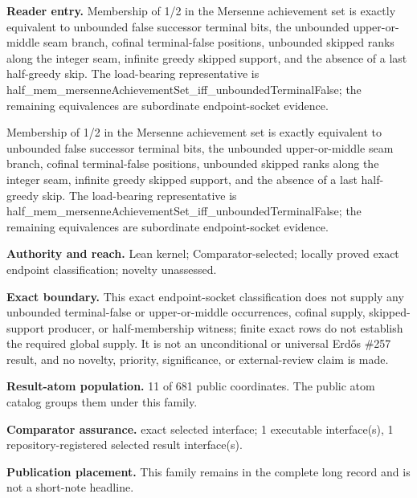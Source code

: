 \textbf{Reader entry.} Membership of 1/2 in the Mersenne achievement set is exactly equivalent to unbounded false successor terminal bits, the unbounded upper-or-middle seam branch, cofinal terminal-false positions, unbounded skipped ranks along the integer seam, infinite greedy skipped support, and the absence of a last half-greedy skip. The load-bearing representative is half\_mem\_mersenneAchievementSet\_iff\_unboundedTerminalFalse; the remaining equivalences are subordinate endpoint-socket evidence.

Membership of 1/2 in the Mersenne achievement set is exactly equivalent to unbounded false successor terminal bits, the unbounded upper-or-middle seam branch, cofinal terminal-false positions, unbounded skipped ranks along the integer seam, infinite greedy skipped support, and the absence of a last half-greedy skip. The load-bearing representative is half\_mem\_mersenneAchievementSet\_iff\_unboundedTerminalFalse; the remaining equivalences are subordinate endpoint-socket evidence.

\textbf{Authority and reach.} Lean kernel; Comparator-selected; locally proved exact endpoint classification; novelty unassessed.

\textbf{Exact boundary.} This exact endpoint-socket classification does not supply any unbounded terminal-false or upper-or-middle occurrences, cofinal supply, skipped-support producer, or half-membership witness; finite exact rows do not establish the required global supply. It is not an unconditional or universal Erdős \#257 result, and no novelty, priority, significance, or external-review claim is made.

\textbf{Result-atom population.} 11 of 681 public coordinates. The public atom catalog groups them under this family.

\textbf{Comparator assurance.} exact selected interface; 1 executable interface(s), 1 repository-registered selected result interface(s).

\textbf{Publication placement.} This family remains in the complete long record and is not a short-note headline.

